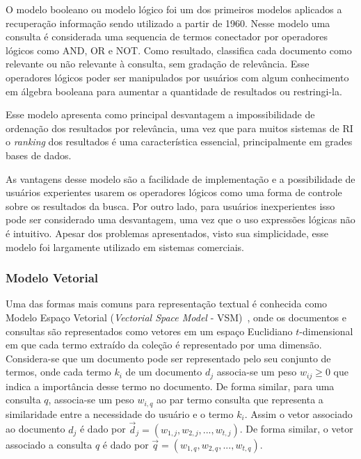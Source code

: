 O modelo booleano ou modelo lógico foi um dos primeiros modelos aplicados a recuperação informação sendo utilizado a partir de 1960. Nesse modelo uma consulta é considerada uma sequencia de termos conectador por operadores lógicos como AND, OR e NOT. Como resultado, classifica cada documento como relevante ou não relevante à consulta, sem gradação de relevância. Esse operadores lógicos poder ser manipulados por usuários com algum conhecimento em álgebra booleana para aumentar a quantidade de resultados ou restringi-la.

Esse modelo apresenta como principal desvantagem a impossibilidade de ordenação dos resultados por relevância, uma vez que para muitos sistemas de RI o \textit{ranking} dos resultados é uma característica essencial, principalmente em grades bases de dados. 

As vantagens desse modelo são a facilidade de implementação e a possibilidade de usuários experientes usarem os operadores lógicos como uma forma de controle sobre os resultados da busca. Por outro lado, para usuários inexperientes isso pode ser considerado uma desvantagem, uma vez que o uso expressões lógicas não é intuitivo. Apesar dos problemas apresentados, visto sua simplicidade, esse modelo foi largamente utilizado em sistemas comerciais. 



\subsubsection{Modelo Vetorial}


Uma das formas mais comuns para representação textual é conhecida como Modelo Espaço Vetorial (\textit{Vectorial Space Model} - VSM)~\cite{Rezende2003}, onde os documentos e consultas são representados como vetores em um espaço Euclidiano $t$-dimensional em que cada termo extraído da coleção é representado por uma dimensão. 
% 
Considera-se que um documento pode ser representado pelo seu conjunto de termos, onde cada termo $k_i$ de um documento $d_j$ associa-se um peso $w_{ij}\geq0$ que indica a importância desse termo no documento. 
%
De forma similar, para uma consulta $q$, associa-se um peso $w_{i,q}$ ao par termo consulta que representa a similaridade entre a necessidade do usuário e o termo $k_i$. 
%
Assim o vetor associado ao documento $d_j$ é dado por $\vec{d}_{j} = (w_{1,j}, w_{2,j}, ..., w_{t,j})$. 
%
De forma similar, o vetor associado a consulta $q$ é dado por $\vec{q} = (w_{1,q}, w_{2,q}, ..., w_{t,q})$.

